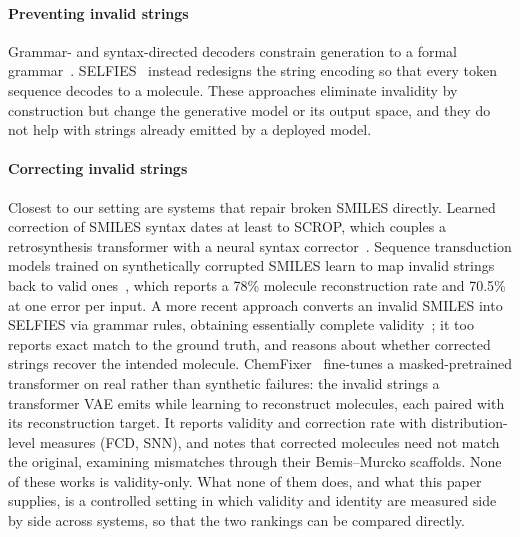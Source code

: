 \documentclass[conference]{IEEEtran}
\begin{document}
\paragraph{Preventing invalid strings}
Grammar- and syntax-directed decoders constrain generation to a formal
grammar~\citep{kusner2017grammar,dai2018syntax,geng2023grammar}.
SELFIES~\citep{krenn2020selfies,krenn2022selfies} instead redesigns the string
encoding so that every token sequence decodes to a molecule. These approaches
eliminate invalidity by construction but change the generative model or its
output space, and they do not help with strings already emitted by a deployed
model.

\paragraph{Correcting invalid strings}
Closest to our setting are systems that repair broken SMILES directly. Learned
correction of SMILES syntax dates at least to SCROP, which couples a
retrosynthesis transformer with a neural syntax corrector~\citep{zheng2020scrop}.
Sequence
transduction models trained on synthetically corrupted SMILES learn to map
invalid strings back to valid ones~\citep{schoenmaker2023uncorrupt}, which
reports a 78\% molecule reconstruction rate and 70.5\% at one error per input.
A more recent approach converts an invalid SMILES into SELFIES via grammar rules,
obtaining essentially complete validity~\citep{smiself2025}; it too reports exact
match to the ground truth, and reasons about whether corrected strings recover the
intended molecule. ChemFixer~\citep{park2026chemfixer} fine-tunes a
masked-pretrained transformer on real rather than synthetic failures: the invalid strings a transformer
VAE emits while learning to reconstruct molecules, each paired with its
reconstruction target. It reports validity and correction rate with
distribution-level measures (FCD, SNN), and notes that corrected molecules need
not match the original, examining mismatches through their Bemis--Murcko
scaffolds. None of these works is
validity-only. What none of them does, and what this
paper supplies, is a controlled setting in which validity and identity are measured
side by side across systems, so that the two rankings can be compared directly.
\end{document}
